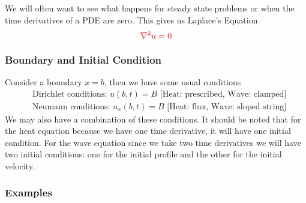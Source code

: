 \documentclass[reqno]{amsart}
\theoremstyle{definition}
\begin{document}
We will often want to see what happens for steady state problems or when
the time derivatives of a PDE are zero.  This gives us Laplace's Equation
%
\begin{equation}
\color{red} \nabla^2 u = 0
\end{equation}

\bigskip
\bigskip

\subsubsection*{Boundary and Initial Condition}

Consider a boundary $x = b$, then we have some usual conditions
%
\begin{align*}
&\text{Dirichlet conditions:  } u(b,t) = B \text{  [Heat: prescribed, Wave: clamped]}\\
&\text{Neumann conditions:  }  u_x(b,t) = B \text{  [Heat: flux, Wave: sloped string]}
\end{align*}
%
We may also have a combination of these conditions.
It should be noted that for the heat equation because
we have one time derivative, it will have one initial condition.
For the wave equation since we take two time derivatives we will
have two initial conditions: one for the initial profile and the other
for the initial velocity.

\bigskip
\bigskip

\subsubsection*{Examples}
\end{document}
